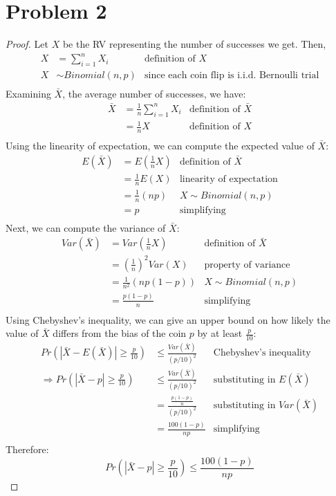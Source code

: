\documentclass[11pt]{article}
\begin{document}
\section*{Problem 2}
\begin{proof}
	Let $X$ be the RV representing the number of successes we get. Then,
	\begin{align*}
		X &= \sum_{i=1}^{n} X_i & \text{definition of } X \\
		X & \sim Binomial (n, p) & \text{since each coin flip is i.i.d. Bernoulli trial} \\
	\end{align*}
	Examining $\bar{X}$, the average number of successes, we have:
	\begin{align*}
		\bar{X} &= \frac{1}{n} \sum_{i=1}^{n} X_i & \text{definition of } \bar{X} \\
		&= \frac{1}{n} X & \text{definition of } X \\
	\end{align*}
	Using the linearity of expectation, we can compute the expected value of $\bar{X}$:
	\begin{align*}
		E(\bar{X}) &= E(\frac{1}{n} X) & \text{definition of } \bar{X} \\
		&= \frac{1}{n} E(X) & \text{linearity of expectation} \\
		&= \frac{1}{n} (np) & X \sim Binomial(n, p) \\
		&= p & \text{simplifying} \\
	\end{align*}
	Next, we can compute the variance of $\bar{X}$:
	\begin{align*}
		Var(\bar{X}) &= Var(\frac{1}{n} X) & \text{definition of } \bar{X} \\
		&= \left(\frac{1}{n}\right)^2 Var(X) & \text{property of variance} \\
		&= \frac{1}{n^2} (np(1-p)) & X \sim Binomial(n, p) \\
		&= \frac{p(1-p)}{n} & \text{simplifying} \\
	\end{align*}
	Using Chebyshev's inequality, we can give an upper bound on how likely the value of $\bar{X}$ differs from the bias of the coin $p$ by at least $\frac{p}{10}$:
	\begin{align*}
		Pr(|\bar{X} - E(\bar{X})| \geq \frac{p}{10}) &\leq \frac{Var(\bar{X})}{(p/10)^2} & \text{Chebyshev's inequality} \\
		\Rightarrow Pr(|\bar{X} - p| \geq \frac{p}{10}) &\leq \frac{Var(\bar{X})}{(p/10)^2} & \text{substituting in } E(\bar{X}) \\
		&= \frac{\frac{p(1-p)}{n}}{(p/10)^2} & \text{substituting in } Var(\bar{X}) \\
		&= \frac{100(1-p)}{np} & \text{simplifying} \\
	\end{align*}
	Therefore:
	\[
		Pr(|\bar{X} - p| \geq \frac{p}{10}) \leq \frac{100(1-p)}{np}
	\]
\end{proof}
\end{document}
